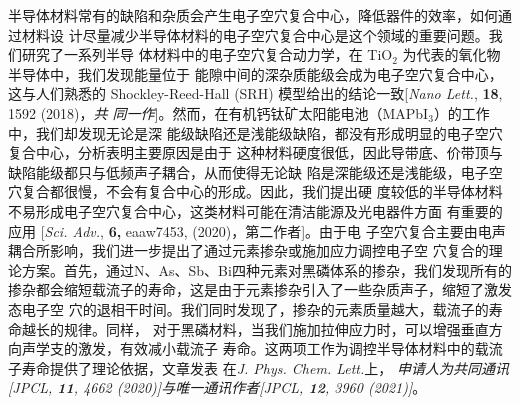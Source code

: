 半导体材料常有的缺陷和杂质会产生电子空穴复合中心，降低器件的效率，如何通过材料设
计尽量减少半导体材料的电子空穴复合中心是这个领域的重要问题。我们研究了一系列半导
体材料中的电子空穴复合动力学，在 TiO$_2$ 为代表的氧化物半导体中，我们发现能量位于
能隙中间的深杂质能级会成为电子空穴复合中心，这与人们熟悉的 Shockley-Reed-Hall
(SRH) 模型给出的结论一致[\textit{Nano Lett.}, \textbf{18}, 1592 (2018)，\emph{共
  同一作}]。然而，在有机钙钛矿太阳能电池（MAPbI$_3$）的工作中，我们却发现无论是深
能级缺陷还是浅能级缺陷，都没有形成明显的电子空穴复合中心，分析表明主要原因是由于
这种材料硬度很低，因此导带底、价带顶与缺陷能级都只与低频声子耦合，从而使得无论缺
陷是深能级还是浅能级，电子空穴复合都很慢，不会有复合中心的形成。因此，我们提出硬
度较低的半导体材料不易形成电子空穴复合中心，这类材料可能在清洁能源及光电器件方面
有重要的应用 [\textit{Sci. Adv.}, \textbf{6,} eaaw7453, (2020)，第二作者]。由于电
子空穴复合主要由电声耦合所影响，我们进一步提出了通过元素掺杂或施加应力调控电子空
穴复合的理论方案。首先，通过N、As、Sb、Bi四种元素对黑磷体系的掺杂，我们发现所有的
掺杂都会缩短载流子的寿命，这是由于元素掺杂引入了一些杂质声子，缩短了激发态电子空
穴的退相干时间。我们同时发现了，掺杂的元素质量越大，载流子的寿命越长的规律。同样，
对于黑磷材料，当我们施加拉伸应力时，可以增强垂直方向声学支的激发，有效减小载流子
寿命。这两项工作为调控半导体材料中的载流子寿命提供了理论依据，文章发表
在\textit{J. Phys. Chem. Lett.}上， \emph{申请人为共同通讯[\textit{JPCL},
  \textbf{11}, 4662 (2020)]与唯一通讯作者[\textit{JPCL}, \textbf{12}, 3960
  (2021)]}。


